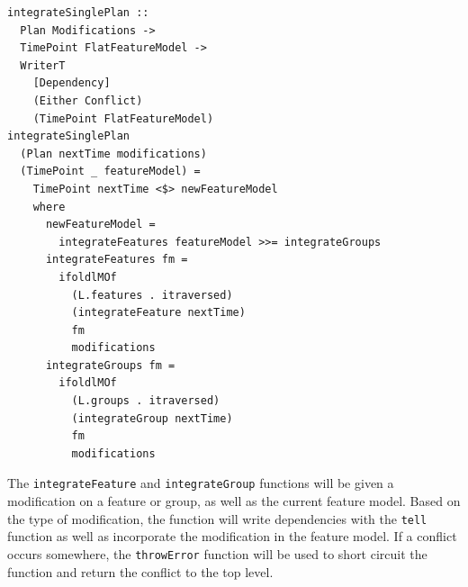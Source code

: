 \documentclass[a4paper,english]{ifimaster}
\begin{document}
\begin{verbatim}
integrateSinglePlan ::
  Plan Modifications ->
  TimePoint FlatFeatureModel ->
  WriterT
    [Dependency]
    (Either Conflict)
    (TimePoint FlatFeatureModel)
integrateSinglePlan
  (Plan nextTime modifications)
  (TimePoint _ featureModel) =
    TimePoint nextTime <$> newFeatureModel
    where
      newFeatureModel =
        integrateFeatures featureModel >>= integrateGroups
      integrateFeatures fm =
        ifoldlMOf
          (L.features . itraversed)
          (integrateFeature nextTime)
          fm
          modifications
      integrateGroups fm =
        ifoldlMOf
          (L.groups . itraversed)
          (integrateGroup nextTime)
          fm
          modifications
\end{verbatim}

The \texttt{integrateFeature} and \texttt{integrateGroup} functions will be given a modification on a feature or group, as well as the current feature model. Based on the type of modification, the function will write dependencies with the \texttt{tell} function as well as incorporate the modification in the feature model. If a conflict occurs somewhere, the \texttt{throwError} function will be used to short circuit the function and return the conflict to the top level.
\end{document}
